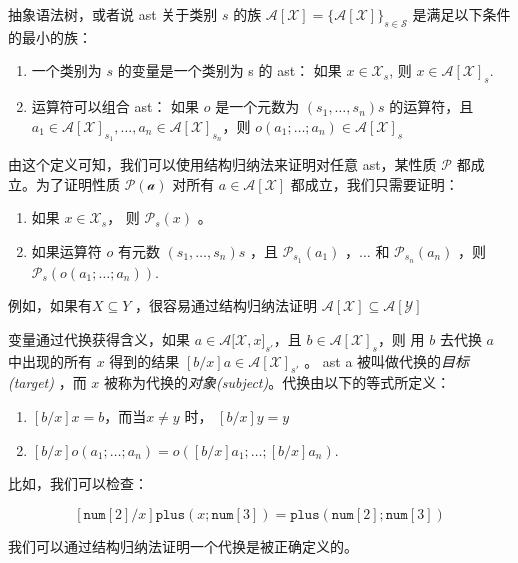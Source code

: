抽象语法树，或者说 ast 关于类别 \(s\) 的族
\(\mathcal{A}[\mathcal{X}]=\{\mathcal{A}[\mathcal{X}]\}_{s\in\mathcal{S}}\)
是满足以下条件的最小的族：

\begin{enumerate}
\def\labelenumi{\arabic{enumi}.}
\item
  一个类别为 \(s\) 的变量是一个类别为 s 的 ast： 如果
  \(x\in \mathcal{X}_s\), 则 \(x \in \mathcal{A[X]}_s\).
\item
  运算符可以组合 ast： 如果 \(o\) 是一个元数为 \((s_1,\dots, s_n)s\)
  的运算符，且
  \(a_1\in \mathcal{A[X]}_{s_1},\dots,a_n\in\mathcal{A[X]}_{s_n}\)，则
  \(o(a_1;\dots ;a_n)\in\mathcal{A[X]}_s\)
\end{enumerate}

由这个定义可知，我们可以使用结构归纳法来证明对任意 ast，某性质
\(\mathcal{P}\) 都成立。为了证明性质 \(\mathcal{P(a)}\) 对所有
\(a\in\mathcal{A[X]}\) 都成立，我们只需要证明：

\begin{enumerate}
\def\labelenumi{\arabic{enumi}.}
\item
  如果 \(x\in\mathcal{X}_s\)， 则 \(\mathcal{P}_s(x)\) 。
\item
  如果运算符 \(o\) 有元数 \((s_1,\dots, s_n)s\) ，且
  \(\mathcal{P}_{s_1}(a_1)\) ，\(\dots\) 和 \(\mathcal{P}_{s_n}(a_n)\)
  ，则 \(\mathcal{P}_s(o(a_1;\dots ;a_n))\).
\end{enumerate}

例如，如果有\(X\subseteq Y\) ，很容易通过结构归纳法证明
\(\mathcal{A[X]\subseteq A[Y]}\)

变量通过代换获得含义，如果 \(a\in\mathcal{A[X,}x]_{s'}\)，且
\(b\in \mathcal{A[X]}_s\)，则 用 \(b\) 去代换 \(a\) 中出现的所有 \(x\)
得到的结果 \([b/x]a\in \mathcal{A[X]}_{s'}\) 。 ast a
被叫做代换的\emph{目标(target)} ，而 \(x\)
被称为代换的\emph{对象(subject)}。代换由以下的等式所定义：

\begin{enumerate}
\def\labelenumi{\arabic{enumi}.}
\item
  \([b/x]x=b\)，而当\(x\neq y\) 时， \([b/x]y=y\) 
\item
  \([b/x]o(a_1;\dots;a_n)=o([b/x]a_1;\dots ;[b/x]a_n)\).
\end{enumerate}

比如，我们可以检查：

\[[\texttt{num}[2]/x]\texttt{plus}(x;\texttt{num}[3])=\texttt{plus}(\texttt{num}[2];\texttt{num}[3])\]

我们可以通过结构归纳法证明一个代换是被正确定义的。

